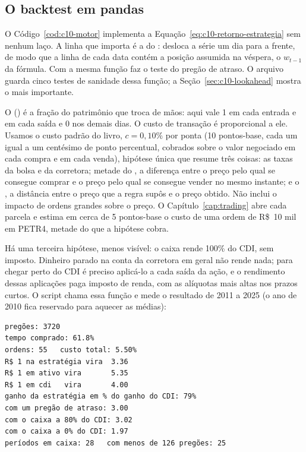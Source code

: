 \subsection{O backtest em pandas}

O Código~\ref{cod:c10-motor} implementa a Equação~\eqref{eq:c10-retorno-estrategia} sem nenhum laço. A linha que importa é a do :  desloca a série um dia para a frente, de modo que a linha de cada data contém a posição assumida na véspera, o $w_{t-1}$ da fórmula. Com  a mesma função faz o teste do pregão de atraso. O arquivo  guarda cinco testes de sanidade dessa função; a Seção~\ref{sec:c10-lookahead} mostra o mais importante.



O  () é a fração do patrimônio que troca de mãos: aqui vale 1 em cada entrada e em cada saída e 0 nos demais dias. O custo de transação é proporcional a ele. Usamos o custo padrão do livro, $c = 0,10\%$ por ponta (10 pontos-base, cada um igual a um centésimo de ponto percentual, cobrados sobre o valor negociado em cada compra e em cada venda), hipótese única que resume três coisas: as taxas da bolsa e da corretora; metade do , a diferença entre o preço pelo qual se consegue comprar e o preço pelo qual se consegue vender no mesmo instante; e o , a distância entre o preço que a regra supôs e o preço obtido. Não inclui o impacto de ordens grandes sobre o preço. O Capítulo~\ref{cap:trading} abre cada parcela e estima em cerca de 5 pontos-base o custo de uma ordem de R\$~10 mil em PETR4, metade do que a hipótese cobra.

Há uma terceira hipótese, menos visível: o caixa rende 100\% do CDI, sem imposto. Dinheiro parado na conta da corretora em geral não rende nada; para chegar perto do CDI é preciso aplicá-lo a cada saída da ação, e o rendimento dessas aplicações paga imposto de renda, com as alíquotas mais altas nos prazos curtos. O script  chama essa função e mede o resultado de 2011 a 2025 (o ano de 2010 fica reservado para aquecer as médias):

\begin{lstlisting}[style=saida]
pregões: 3720
tempo comprado: 61.8%
ordens: 55   custo total: 5.50%
R$ 1 na estratégia vira  3.36
R$ 1 em ativo vira       5.35
R$ 1 em cdi   vira       4.00
ganho da estratégia em % do ganho do CDI: 79%
com um pregão de atraso: 3.00
com o caixa a 80% do CDI: 3.02
com o caixa a 0% do CDI: 1.97
períodos em caixa: 28   com menos de 126 pregões: 25
\end{lstlisting}

